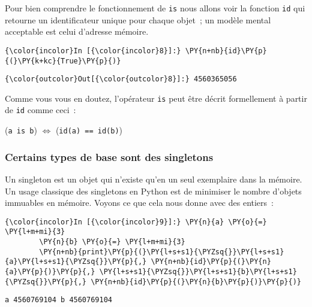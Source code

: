     Pour bien comprendre le fonctionnement de \texttt{is} nous allons voir
la fonction \texttt{id} qui retourne un identificateur unique pour
chaque objet~; un modèle mental acceptable est celui d'adresse mémoire.

    \begin{Verbatim}[commandchars=\\\{\}]
{\color{incolor}In [{\color{incolor}8}]:} \PY{n+nb}{id}\PY{p}{(}\PY{k+kc}{True}\PY{p}{)}
\end{Verbatim}


\begin{Verbatim}[commandchars=\\\{\}]
{\color{outcolor}Out[{\color{outcolor}8}]:} 4560365056
\end{Verbatim}
            
    Comme vous vous en doutez, l'opérateur \texttt{is} peut être décrit
formellement à partir de \texttt{id} comme ceci~:

(\texttt{a\ is\ b}) \(\Longleftrightarrow\) (\texttt{id(a)\ ==\ id(b)})

    \hypertarget{certains-types-de-base-sont-des-singletons}{%
\subsubsection{Certains types de base sont des
singletons}\label{certains-types-de-base-sont-des-singletons}}

    Un singleton est un objet qui n'existe qu'en un seul exemplaire dans la
mémoire. Un usage classique des singletons en Python est de minimiser le
nombre d'objets immuables en mémoire. Voyons ce que cela nous donne avec
des entiers~:

    \begin{Verbatim}[commandchars=\\\{\}]
{\color{incolor}In [{\color{incolor}9}]:} \PY{n}{a} \PY{o}{=} \PY{l+m+mi}{3}
        \PY{n}{b} \PY{o}{=} \PY{l+m+mi}{3}
        \PY{n+nb}{print}\PY{p}{(}\PY{l+s+s1}{\PYZsq{}}\PY{l+s+s1}{a}\PY{l+s+s1}{\PYZsq{}}\PY{p}{,} \PY{n+nb}{id}\PY{p}{(}\PY{n}{a}\PY{p}{)}\PY{p}{,} \PY{l+s+s1}{\PYZsq{}}\PY{l+s+s1}{b}\PY{l+s+s1}{\PYZsq{}}\PY{p}{,} \PY{n+nb}{id}\PY{p}{(}\PY{n}{b}\PY{p}{)}\PY{p}{)}
\end{Verbatim}


    \begin{Verbatim}[commandchars=\\\{\}]
a 4560769104 b 4560769104

    \end{Verbatim}

